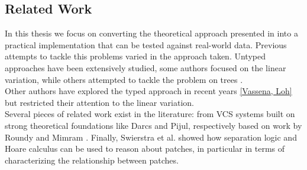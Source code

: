 \documentclass[11pt, titlepage]{article}
\begin{document}
\subsection{Related Work}\label{rel-work}
In this thesis we focus on converting the theoretical approach presented in \cite{type-directed-diff} into a practical implementation that can be tested against real-world data. Previous attempts to tackle this problems varied in the approach taken. 
Untyped approaches have been extensively studied, some authors focused on the linear \cite{diff, bergroth} variation, while others attempted to tackle the problem on trees \cite{Akutsu, klein,demanie, billie, autexier, chawalthe}. 
\\
Other authors have explored the typed approach in recent years \ref{Vassena, Loh} but restricted their attention to the linear variation. 
\\
Several pieces of related work exist in the literature: from VCS systems built on strong theoretical foundations like Darcs and Pijul, respectively based on work by Roundy \cite{darcs} and Mimram \cite{cat-of-patches}. 
Finally, Swierstra et al. \cite{swie-loh} showed how separation logic and Hoare calculus can be used to reason about patches, in particular in terms of characterizing the relationship between patches.
%
\end{document}
